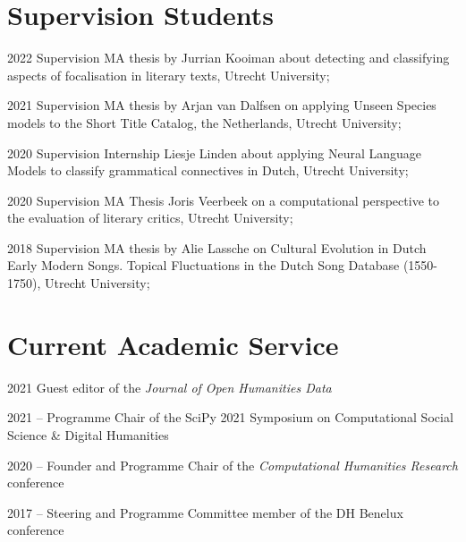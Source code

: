 \documentclass[12pt,letterpaper]{report}
\begin{document}
\section*{Supervision Students}
\begin{tablist}
  \item[2022] \tab{}Supervision MA thesis by Jurrian Kooiman about detecting and
    classifying aspects of focalisation in literary texts, Utrecht University;
  \item[2021] \tab{}Supervision MA thesis by Arjan van Dalfsen on applying
    Unseen Species models to the Short Title Catalog, the Netherlands, Utrecht University;
  \item[2020] \tab{}Supervision Internship Liesje Linden about applying Neural Language
    Models to classify grammatical connectives in Dutch, Utrecht University;
  \item[2020] \tab{}Supervision MA Thesis Joris Veerbeek on a computational perspective to
    the evaluation of literary critics, Utrecht University;
  \item[2018] \tab{} Supervision MA thesis by Alie Lassche on Cultural Evolution
    in Dutch Early Modern Songs. Topical Fluctuations in the Dutch Song Database
    (1550-1750), Utrecht University;
\end{tablist}

\section*{Current Academic Service}
\begin{tablist}
\item[2021] \tab{}Guest editor of the \textit{Journal of Open Humanities Data}
\item[2021 --] \tab{}Programme Chair of the SciPy 2021 Symposium on Computational Social Science
  \& Digital Humanities
\item[2020 --] \tab{}Founder and Programme Chair of the \textit{Computational Humanities
    Research} conference
\item[2017 --] \tab{}Steering and Programme Committee member of the DH Benelux conference
\end{tablist}
\end{document}
